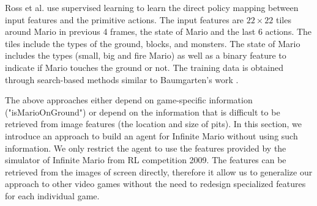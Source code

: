Ross et al. \cite{Ross11} use supervised learning to learn the direct policy
mapping between input features and the primitive actions. The input features
are $22 \times 22$ tiles around Mario in previous 4 frames, the state of Mario
and the last 6 actions. The tiles include the types of the ground, blocks, and
monsters.  The state of Mario includes the types (small, big and fire Mario) as well as a
binary feature to indicate if Mario touches the ground or not.
The training data is obtained through search-based methods similar to Baumgarten's work \cite{Robin09}.


The above approaches either depend on game-specific information ("isMarioOnGround")
or depend on the information that is difficult to be retrieved from image features (the location and size of pits).
In this section, we introduce an approach 
to build an agent for Infinite Mario 
without using such information.
We only restrict the agent to use the features provided by the simulator of Infinite Mario from RL competition 2009.
The features can be retrieved from the images of screen directly, 
therefore it allow us to generalize our approach to other video games without
the need to redesign specialized features for each individual game.




